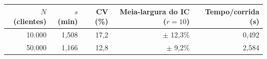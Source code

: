 \begin{tabular}{rrrrr}
\toprule
$N$ (clientes) & $s$ (min) & CV (\%) & Meia-largura do IC ($r=10$) & Tempo/corrida (s) \\
\midrule
10.000 & 1,508 & 17,2 & $\pm$ 12,3\% & 0,492 \\
50.000 & 1,166 & 12,8 & $\pm$ 9,2\% & 2,584 \\
\bottomrule
\end{tabular}
